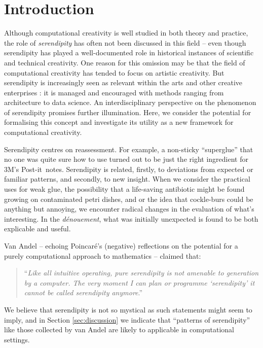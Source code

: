 \section{Introduction}

Although computational creativity is well studied in both theory and
practice, the role of \emph{serendipity} has often not been discussed
in this field -- even though serendipity has played a well-documented
role in historical instances of scientific and technical creativity.
One reason for this omission may be that the field of computational
creativity has tended to focus on artistic creativity.  But
serendipity is increasingly seen as relevant within the arts
\cite{mckay-serendipity} and other creative enterprises
\cite{kakko2009homo,engineering-serendipity}: it is managed and
encouraged with methods ranging from architecture to data science.
%
An interdisciplinary perspective on the phenomenon of serendipity
promises further illumination.  Here, we consider the potential for
formalising this concept and investigate its utility as a new
framework for computational creativity.

Serendipity centres on reassessment.  For example, a non-sticky
``superglue'' that no one was quite sure how to use turned out to be
just the right ingredient for 3M's Post-it\texttrademark\ notes.
%
Serendipity is related, firstly, to deviations from expected or
familiar patterns, and secondly, to new insight.
%
When we consider the practical uses for weak glue, the possibility
that a life-saving antibiotic might be found growing on contaminated
petri dishes, and or the idea that cockle-burs could be anything but
annoying, we encounter radical changes in the evaluation of what's
interesting.  In the \emph{d\'enouement}, what was initially
unexpected is found to be both explicable and useful.

Van Andel \citeyear{van1994anatomy} -- echoing Poincar\'e's
\citeyear{poincare1910creation} (negative) reflections on the potential
for a purely computational approach to mathematics -- claimed that:
\begin{quote}
``\emph{Like all intuitive operating, pure serendipity is not amenable
    to generation by a computer.  The very moment I can plan or
    programme `serendipity' it cannot be called serendipity
    anymore}.'' \cite{van1994anatomy}
\end{quote}
We believe that serendipity is not so mystical as such statements
might seem to imply, and in Section \ref{sec:discussion} we indicate
that ``patterns of serendipity'' like those collected by van Andel
are likely to applicable in computational settings.

